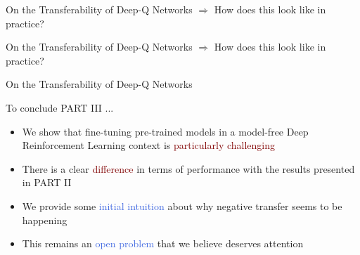 \documentclass{beamer}
\begin{document}
\begin{frame}{On the Transferability of Deep-Q Networks}
	\bigskip
	$\Rightarrow$ How does this look like in practice?
	\bigskip
	

\end{frame}

\begin{frame}{On the Transferability of Deep-Q Networks}
	\bigskip
	$\Rightarrow$ How does this look like in practice?
	\bigskip
	

\end{frame}

\begin{frame}{On the Transferability of Deep-Q Networks}
	
	To conclude PART III ...
	\bigskip
	\begin{itemize}
		\item We show that fine-tuning pre-trained models in a model-free Deep Reinforcement Learning context is \textcolor{Maroon}{particularly challenging} 
		\item There is a clear \textcolor{Maroon}{difference} in terms of performance with the results presented in PART II
		\item We provide some \textcolor{RoyalBlue}{initial intuition} about why negative transfer seems to be happening
		\item This remains an \textcolor{RoyalBlue}{open problem} that we believe deserves attention
	\end{itemize}


\end{frame}
\end{document}
